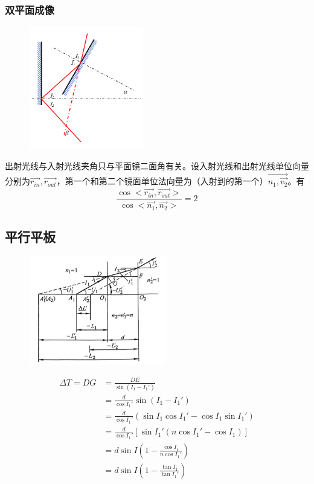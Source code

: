 \subsubsection{双平面成像}
        \begin{figure}[H]
            \centering
            \includegraphics[width=5cm]{img/4.3.png}
            \end{figure}
出射光线与入射光线夹角只与平面镜二面角有关。设入射光线和出射光线单位向量分别为$\vec{r_{in}},\vec{r_{out}}$，第一个和第二个镜面单位法向量为（入射到的第一个）$\vec{n_1,\vec{v_2}}$。有
\begin{equation}
\frac{\cos <\vec{r_{in}},\vec{r_{out}}>}{\cos <\vec{n_1},\vec{n_2}>}=2\tag{4.1.3}
\end{equation}
\subsection{平行平板}
        \begin{figure}[H]
            \centering
            \includegraphics[width=6cm]{img/4.4.png}
        \end{figure}
\begin{equation}
\begin{aligned}
    \Delta T=DG&=\frac{DE}{\sin(I_1-I_1')} \\
    &=\frac{d}{\cos I_1'}\sin(I_1-I_1')\\
    &=\frac{d}{\cos I_1'}(\sin I_1\cos I_1'-\cos I_1\sin I_1')\\
    &=\frac{d}{\cos I_1'}[\sin I_1'(n \cos I_1'-\cos I_1)]\\
    &=d\sin I(1-\frac{\cos I_1}{n \cos I_1'})\\
    &=d\sin I(1-\frac{\tan I_1}{\tan I_1'})
\end{aligned}\tag{4.2.1}
\end{equation}

